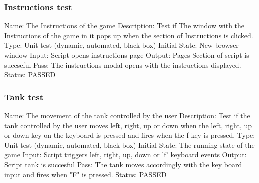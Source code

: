 \documentclass{article}
\begin{document}
\subsubsection{Instructions test}
\label{sec:3.1.14}
Name:  The Instructions of the game\newline
Description: Test if The window with the Instructions of the game in it pops up 
when the section of Instructions is clicked. \newline
Type: Unit test (dynamic, automated, black box) \newline
Initial State: New browser window \newline
Input: Script opens instructions page\newline
Output: Pages Section of script is succseful\newline
Pass:  The instructions modal opens with the instructions displayed.  \newline
\newline Status: PASSED

\subsubsection{Tank test}
\label{sec:3.1.15}
Name:  The movement of the tank controlled by the user\newline
Description: Test if the tank controlled by the user moves left, right, up or 
down when the left, right, up or down key on the keyboard is pressed and
fires when the f key is pressed. \newline
Type: Unit test (dynamic, automated, black box) \newline
Initial State:  The running state of the game \newline
Input: Script triggers left, right, up, down or 'f' keyboard events\newline
Output: Script tank is succesful\newline
Pass: The tank moves accordingly with the key board input and 
fires when "F" is pressed. \newline
\newline Status: PASSED
\end{document}
